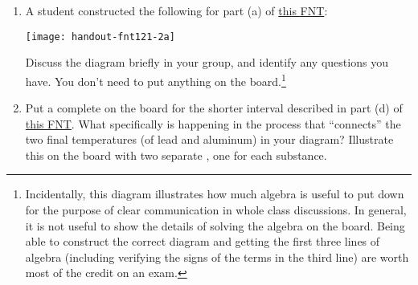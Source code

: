 \begin{enumerate}[1.]
	\item A student constructed the following \EnergyDiagram{} for part (a) of \hyperref[fnt1.2.1-2]{this FNT}:

	\texttt{[image: handout-fnt121-2a]}
	
	Discuss the diagram briefly in your group, and identify any questions you have. You don't need to put anything on the board.\footnote{Incidentally, this diagram illustrates how much algebra is useful to put down for the purpose of clear communication in whole class discussions. In general, it is not useful to show the details of solving the algebra on the board. Being able to construct the correct diagram and getting the first three lines of algebra (including verifying the signs of the terms in the third line) are worth most of the credit on an exam.}
	
	
	\item Put a complete \EnergyDiagram{} on the board for the shorter interval described in part (d) of \hyperref[fnt1.2.1-2]{this FNT}. What specifically is happening in the process that ``connects'' the two final temperatures (of lead and aluminum) in your diagram? Illustrate this on the board with two separate \TempGraphs{}, one for each substance.
	
	

\WCD 

\end{enumerate}

